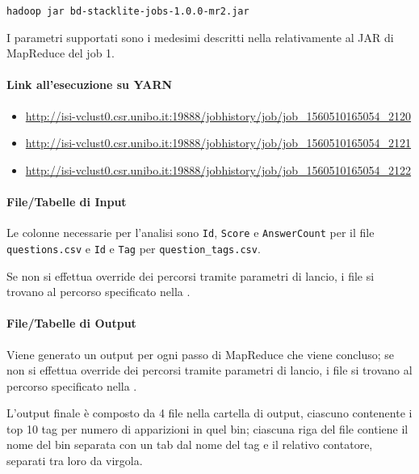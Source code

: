   \texttt{hadoop jar bd-stacklite-jobs-1.0.0-mr2.jar}

  I parametri supportati sono i medesimi descritti nella  relativamente al JAR di MapReduce del job 1.

  \paragraph{Link all'esecuzione su YARN}\label{par:job2:mapreduce:yarn}

  \begin{itemize}
    \item \url{http://isi-vclust0.csr.unibo.it:19888/jobhistory/job/job_1560510165054_2120}
    \item \url{http://isi-vclust0.csr.unibo.it:19888/jobhistory/job/job_1560510165054_2121}
    \item \url{http://isi-vclust0.csr.unibo.it:19888/jobhistory/job/job_1560510165054_2122}
  \end{itemize}

  \paragraph{File/Tabelle di Input}\label{par:job2:mapreduce:input}

  Le colonne necessarie per l'analisi sono \texttt{Id}, \texttt{Score} e \texttt{AnswerCount} per il file \texttt{questions.csv}
  e \texttt{Id} e \texttt{Tag} per \texttt{question\_tags.csv}.

  Se non si effettua override dei percorsi tramite parametri di lancio, i file si trovano al percorso specificato nella .

  \paragraph{File/Tabelle di Output}\label{par:job2:mapreduce:output}

  Viene generato un output per ogni passo di MapReduce che viene concluso;
  se non si effettua override dei percorsi tramite parametri di lancio, i file si trovano al percorso specificato nella .

  L'output finale è composto da 4 file nella cartella di output, ciascuno contenente i top 10 tag per numero di apparizioni in quel bin;
  ciascuna riga del file contiene il nome del bin separata con un tab dal nome del tag e il relativo contatore, separati tra loro da virgola.

